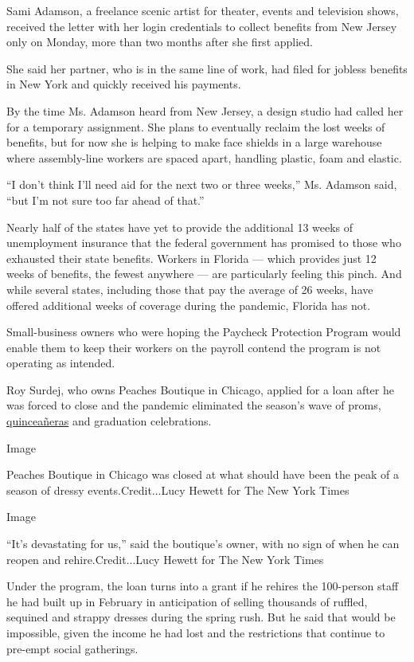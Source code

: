 Sami Adamson, a freelance scenic artist for theater, events and
television shows, received the letter with her login credentials to
collect benefits from New Jersey only on Monday, more than two months
after she first applied.

She said her partner, who is in the same line of work, had filed for
jobless benefits in New York and quickly received his payments.

By the time Ms. Adamson heard from New Jersey, a design studio had
called her for a temporary assignment. She plans to eventually reclaim
the lost weeks of benefits, but for now she is helping to make face
shields in a large warehouse where assembly-line workers are spaced
apart, handling plastic, foam and elastic.

``I don't think I'll need aid for the next two or three weeks,'' Ms.
Adamson said, ``but I'm not sure too far ahead of that.''

Nearly half of the states have yet to provide the additional 13 weeks of
unemployment insurance that the federal government has promised to those
who exhausted their state benefits. Workers in Florida --- which
provides just 12 weeks of benefits, the fewest anywhere --- are
particularly feeling this pinch. And while several states, including
those that pay the average of 26 weeks, have offered additional weeks of
coverage during the pandemic, Florida has not.

Small-business owners who were hoping the Paycheck Protection Program
would enable them to keep their workers on the payroll contend the
program is not operating as intended.

Roy Surdej, who owns Peaches Boutique in Chicago, applied for a loan
after he was forced to close and the pandemic eliminated the season's
wave of proms,
\href{https://www.nytimes.com/2019/11/12/style/quinceaera-genz-millennial.html}{quinceañeras}
and graduation celebrations.

Image

Peaches Boutique in Chicago was closed at what should have been the peak
of a season of dressy events.Credit...Lucy Hewett for The New York Times

Image

``It's devastating for us,'' said the boutique's owner, with no sign of
when he can reopen and rehire.Credit...Lucy Hewett for The New York
Times

Under the program, the loan turns into a grant if he rehires the
100-person staff he had built up in February in anticipation of selling
thousands of ruffled, sequined and strappy dresses during the spring
rush. But he said that would be impossible, given the income he had lost
and the restrictions that continue to pre-empt social gatherings.

